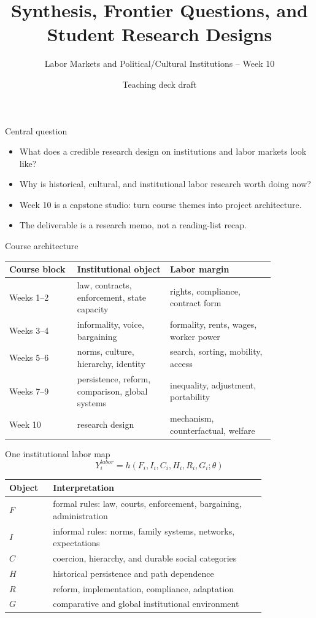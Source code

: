 \documentclass[aspectratio=169,11pt]{beamer}
\title{Synthesis, Frontier Questions, and Student Research Designs}
\subtitle{Labor Markets and Political/Cultural Institutions -- Week 10}
\author{Teaching deck draft}
\date{}
\begin{document}
\begin{frame}
  \titlepage
\end{frame}

\begin{frame}{Central question}
\begin{itemize}
    \item What does a credible research design on institutions and labor markets look like?
    \item Why is historical, cultural, and institutional labor research worth doing now?
    \item Week 10 is a capstone studio: turn course themes into project architecture.
    \item The deliverable is a research memo, not a reading-list recap.
\end{itemize}
\end{frame}

\begin{frame}{Course architecture}
\small
\begin{tabular}{p{0.22\linewidth} p{0.30\linewidth} p{0.34\linewidth}}
\toprule
Course block & Institutional object & Labor margin \\
\midrule
Weeks 1--2 & law, contracts, enforcement, state capacity & rights, compliance, contract form \\
Weeks 3--4 & informality, voice, bargaining & formality, rents, wages, worker power \\
Weeks 5--6 & norms, culture, hierarchy, identity & search, sorting, mobility, access \\
Weeks 7--9 & persistence, reform, comparison, global systems & inequality, adjustment, portability \\
Week 10 & research design & mechanism, counterfactual, welfare \\
\bottomrule
\end{tabular}
\end{frame}

\begin{frame}{One institutional labor map}
\[
Y_i^{labor} = h(F_i, I_i, C_i, H_i, R_i, G_i; \theta)
\]

\small
\begin{tabular}{p{0.13\linewidth} p{0.70\linewidth}}
\toprule
Object & Interpretation \\
\midrule
$F$ & formal rules: law, courts, enforcement, bargaining, administration \\
$I$ & informal rules: norms, family systems, networks, expectations \\
$C$ & coercion, hierarchy, and durable social categories \\
$H$ & historical persistence and path dependence \\
$R$ & reform, implementation, compliance, adaptation \\
$G$ & comparative and global institutional environment \\
\bottomrule
\end{tabular}
\end{frame}
\end{document}
